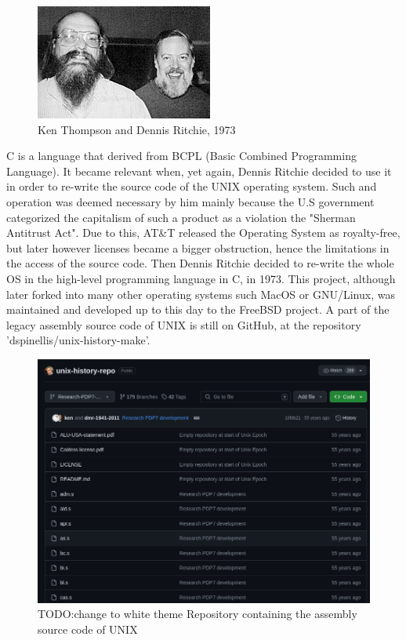 \begin{figure}[htbp]
    \centering
    \includegraphics[scale=0.7]{pictures/KenThompson_and_DennisRitchie1973.jpg}
    \caption{Ken Thompson and Dennis Ritchie, 1973}
    \label{unixMakers}
\end{figure}

\par
C is a language that derived from BCPL (Basic Combined Programming Language).
It became relevant when, yet again, Dennis Ritchie decided to use it in order to re-write the source code of the UNIX operating system.
Such and operation was deemed necessary by him mainly because the U.S government categorized the capitalism of such a product as a violation the "Sherman Antitrust Act"\cite{unixRepo}.
Due to this, AT\&T released the Operating System as royalty-free, but later however licenses became a bigger obstruction, hence the limitations in the access of the source code.
Then Dennis Ritchie decided to re-write the whole OS in the high-level programming language in C, in 1973.
This project, although later forked into many other operating systems such MacOS or GNU/Linux, was maintained and developed up to this day to the FreeBSD project.
A part of the legacy assembly source code of UNIX is still on GitHub, at the repository 'dspinellis/unix-history-make'.

\begin{figure}[htbp]
    \centering
    \includegraphics[scale=0.5]{pictures/unix_repo.png}
    \caption{TODO:change to white theme Repository containing the assembly source code of UNIX}
    \label{unixRepo}
\end{figure}



